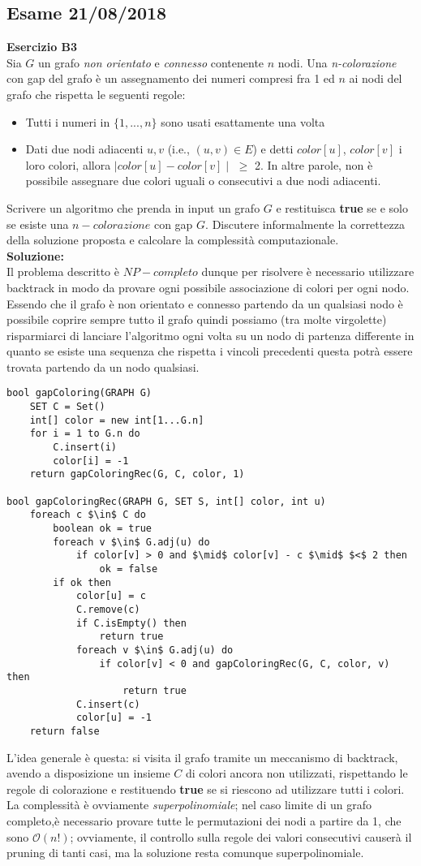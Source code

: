 \documentclass[../cheatSheetAlgoritmi.tex]{subfiles}
\begin{document}
\subsection{Esame 21/08/2018}
\textbf{Esercizio B3}\\
Sia $G$ un grafo \emph{non orientato} e \emph{connesso} contenente $n$ nodi. Una \emph{n-colorazione} con gap del grafo è un assegnamento dei numeri compresi fra 1 ed $n$ ai nodi del grafo che rispetta le seguenti regole:
\begin{itemize}
	\item Tutti i numeri in $\{1,...,n\}$ sono usati esattamente una volta
	\item Dati due nodi adiacenti $u, v$ (i.e., $(u, v) \in E$) e detti $color[u]$, $color[v]$ i  loro  colori,  allora $\mid color[u] - color[v] \mid$ $\geq$ 2. In altre parole, non è possibile assegnare due colori uguali o consecutivi a due nodi adiacenti.
\end{itemize}
Scrivere un algoritmo che prenda in input un grafo $G$ e restituisca \textbf{true} se e solo se esiste una $n-colorazione$ con gap $G$. Discutere informalmente la correttezza   della soluzione proposta e calcolare la complessità computazionale.\\
\textbf{Soluzione:}\\
Il problema descritto è $NP-completo$ dunque per risolvere è necessario utilizzare backtrack in modo da provare ogni possibile associazione di colori per ogni nodo. Essendo che il grafo è non orientato e connesso partendo da un qualsiasi nodo è possibile coprire sempre tutto il grafo quindi possiamo (tra molte virgolette) risparmiarci di lanciare l'algoritmo ogni volta su un nodo di partenza differente in quanto se esiste una sequenza che rispetta i vincoli precedenti questa potrà essere trovata partendo da un nodo qualsiasi.
\begin{lstlisting}[caption=n-Colorazione (gapColoring)]
bool gapColoring(GRAPH G)
	SET C = Set()
	int[] color = new int[1...G.n]
	for i = 1 to G.n do
		C.insert(i)
		color[i] = -1
	return gapColoringRec(G, C, color, 1)
	
bool gapColoringRec(GRAPH G, SET S, int[] color, int u)
	foreach c $\in$ C do
		boolean ok = true
		foreach v $\in$ G.adj(u) do
			if color[v] > 0 and $\mid$ color[v] - c $\mid$ $<$ 2 then
				ok = false
		if ok then
			color[u] = c
			C.remove(c)
			if C.isEmpty() then
				return true
			foreach v $\in$ G.adj(u) do
				if color[v] < 0 and gapColoringRec(G, C, color, v) then
					return true
			C.insert(c)
			color[u] = -1
	return false
\end{lstlisting}
L'idea generale è questa: si visita il grafo tramite un meccanismo di backtrack, avendo a disposizione un insieme $C$ di colori ancora non utilizzati, rispettando le regole di colorazione e restituendo \textbf{true} se si riescono ad utilizzare tutti i colori. La complessità è ovviamente \emph{superpolinomiale}; nel caso limite di un grafo completo,è necessario provare tutte le permutazioni dei nodi a partire da 1, che sono $\mathcal{O}(n!)$; ovviamente, il controllo sulla regole dei valori consecutivi causerà il pruning di tanti casi, ma la soluzione resta comunque superpolinomiale.
\newpage
\end{document}
